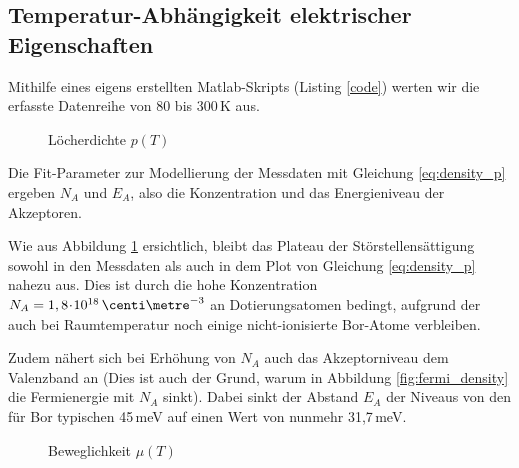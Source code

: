 \subsection{Temperatur-Abhängigkeit elektrischer Eigenschaften} 
Mithilfe eines eigens erstellten Matlab-Skripts (Listing \ref{code}) werten wir die erfasste Datenreihe von 80 bis 300\,K aus.

\begin{figure}[p]
\centering

\caption{Löcherdichte $p(T)$}
\label{fig:plot_p}
\end{figure}

Die Fit-Parameter zur Modellierung der Messdaten mit Gleichung \eqref{eq:density_p} ergeben $N_A$ und $E_A$, also die Konzentration und das Energieniveau der Akzeptoren. 

Wie aus Abbildung \ref{fig:plot_p} ersichtlich, bleibt das Plateau der Störstellensättigung sowohl in den Messdaten als auch in dem Plot von Gleichung \eqref{eq:density_p} nahezu aus. Dies ist durch die hohe Konzentration $N_A = 1,8\cdt 10^{18}\,\centi\metre^{-3}$ an Dotierungsatomen bedingt, aufgrund der auch bei Raumtemperatur noch einige nicht-ionisierte Bor-Atome verbleiben.

Zudem nähert sich bei Erhöhung von $N_A$ auch das Akzeptorniveau dem Valenzband an (Dies ist auch der Grund, warum in Abbildung \ref{fig:fermi_density} die Fermienergie mit $N_A$ sinkt). Dabei sinkt der Abstand $E_A$ der Niveaus von den für Bor typischen 45\,meV auf einen Wert von nunmehr 31,7\,meV.

\begin{figure}[p]
\centering

\caption{Beweglichkeit $\mu(T)$}
\label{fig:plot_mu}
\end{figure}

\newpage
\begin{addmargin}[-3em]{3em}


\end{addmargin}
